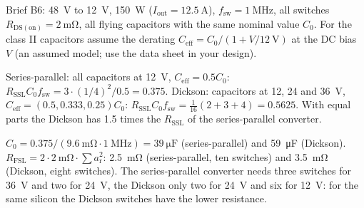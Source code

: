 
Brief B6: \SI{48}{\volt} to \SI{12}{\volt}, \SI{150}{\watt} ($I_\mathrm{out}=\SI{12.5}{\ampere}$), $f_\mathrm{sw}=\SI{1}{\mega\hertz}$, all switches $R_\mathrm{DS(on)}=\SI{2}{\milli\ohm}$, all flying capacitors with the same nominal value $C_0$. For the class II capacitors assume the derating $C_\mathrm{eff}=C_0/(1+V/\SI{12}{\volt})$ at the DC bias $V$ (an assumed model; use the data sheet in your design).


\begin{solutionblock}
	Series-parallel: all capacitors at \SI{12}{\volt}, $C_\mathrm{eff}=0.5C_0$: $R_\mathrm{SSL}C_0f_\mathrm{sw}=3\cdot(1/4)^2/0.5=0.375$. Dickson: capacitors at 12, 24 and \SI{36}{\volt}, $C_\mathrm{eff}=(0.5, 0.333, 0.25)C_0$: $R_\mathrm{SSL}C_0f_\mathrm{sw}=\tfrac{1}{16}(2+3+4)=0.5625$. With equal parts the Dickson has 1.5 times the $R_\mathrm{SSL}$ of the series-parallel converter.
\end{solutionblock}


\begin{solutionblock}
	$C_0=0.375/(\SI{9.6}{\milli\ohm}\cdot\SI{1}{\mega\hertz})=\SI{39}{\micro\farad}$ (series-parallel) and \SI{59}{\micro\farad} (Dickson). $R_\mathrm{FSL}=2\cdot\SI{2}{\milli\ohm}\cdot\sum a_\mathrm{r}^2$: \SI{2.5}{\milli\ohm} (series-parallel, ten switches) and \SI{3.5}{\milli\ohm} (Dickson, eight switches). The series-parallel converter needs three switches for \SI{36}{\volt} and two for \SI{24}{\volt}, the Dickson only two for \SI{24}{\volt} and six for \SI{12}{\volt}: for the same silicon the Dickson switches have the lower resistance.
\end{solutionblock}


